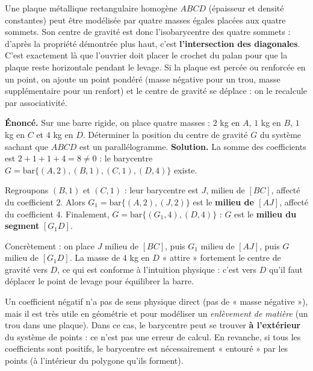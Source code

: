 \documentclass[11pt]{article}
\begin{document}
\begin{exemplebox}
Une plaque métallique rectangulaire homogène $ABCD$ (épaisseur et densité constantes) peut être modélisée par quatre masses égales placées aux quatre sommets. Son centre de gravité est donc l'isobarycentre des quatre sommets : d'après la propriété démontrée plus haut, c'est \textbf{l'intersection des diagonales}. C'est exactement là que l'ouvrier doit placer le crochet du palan pour que la plaque reste horizontale pendant le levage. Si la plaque est percée ou renforcée en un point, on ajoute un point pondéré (masse négative pour un trou, masse supplémentaire pour un renfort) et le centre de gravité se déplace : on le recalcule par associativité.
\end{exemplebox}

\begin{exoresolu}
\textbf{Énoncé.} Sur une barre rigide, on place quatre masses : $2$ kg en $A$, $1$ kg en $B$, $1$ kg en $C$ et $4$ kg en $D$. Déterminer la position du centre de gravité $G$ du système sachant que $ABCD$ est un parallélogramme.
\tcblower
\textbf{Solution.} La somme des coefficients est $2+1+1+4=8\neq 0$ : le barycentre $G=\mathrm{bar}\{(A,2),(B,1),(C,1),(D,4)\}$ existe.

Regroupons $(B,1)$ et $(C,1)$ : leur barycentre est $J$, milieu de $[BC]$, affecté du coefficient $2$.
Alors $G_1=\mathrm{bar}\{(A,2),(J,2)\}$ est le \textbf{milieu de $[AJ]$}, affecté du coefficient $4$.
Finalement, $G=\mathrm{bar}\{(G_1,4),(D,4)\}$ : $G$ est le \textbf{milieu du segment} $[G_1D]$.

Concrètement : on place $J$ milieu de $[BC]$, puis $G_1$ milieu de $[AJ]$, puis $G$ milieu de $[G_1D]$. La masse de $4$ kg en $D$ « attire » fortement le centre de gravité vers $D$, ce qui est conforme à l'intuition physique : c'est vers $D$ qu'il faut déplacer le point de levage pour équilibrer la barre.
\end{exoresolu}

\begin{attention}
Un coefficient négatif n'a pas de sens physique direct (pas de « masse négative »), mais il est très utile en géométrie et pour modéliser un \emph{enlèvement de matière} (un trou dans une plaque). Dans ce cas, le barycentre peut se trouver \textbf{à l'extérieur} du système de points : ce n'est pas une erreur de calcul. En revanche, si tous les coefficients sont positifs, le barycentre est nécessairement « entouré » par les points (à l'intérieur du polygone qu'ils forment).
\end{attention}
\end{document}
